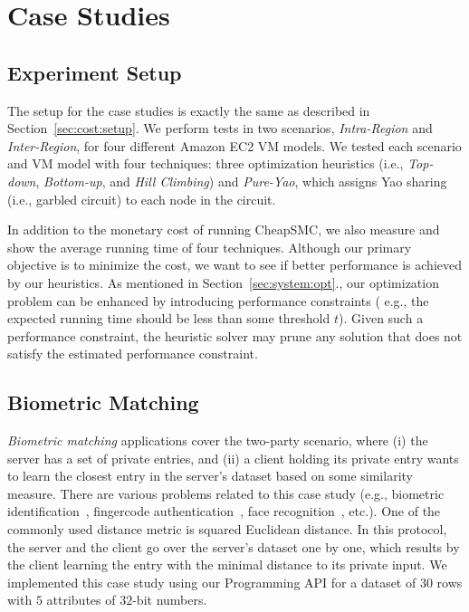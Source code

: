 \documentclass{llncs}
\newcommand{\sysname}{{CheapSMC}\xspace}
\begin{document}
\section{Case Studies}
\label{sec:case}

\subsection{Experiment Setup}
\label{sec:case:setup}

The setup for the case studies is exactly the same as described in Section~\ref{sec:cost:setup}. We perform tests in two scenarios, \emph{Intra-Region} and \emph{Inter-Region}, for four different Amazon EC2 VM models. We tested each scenario and VM model with four techniques: three optimization heuristics (i.e., \emph{Top-down}, \emph{Bottom-up}, and \emph{Hill Climbing}) and \emph{Pure-Yao}, which assigns Yao sharing (i.e., garbled circuit) to each node in the circuit. 

In addition to the monetary cost of running \sysname, we also measure and show the average running time of four techniques. Although our primary objective is to minimize the cost, we want to see if better performance is achieved by our heuristics. As mentioned in Section~\ref{sec:system:opt}., our optimization problem can be enhanced by introducing performance constraints ( e.g., the expected running time should be less than some threshold $t$). Given such a performance constraint, the heuristic solver may prune any solution that does not satisfy the estimated performance constraint. 

\subsection{Biometric Matching}
\label{sec:case:set}

\emph{Biometric matching} applications cover the two-party scenario, where (i) the server has a set of private entries, and (ii) a client holding its private entry wants to learn the closest entry in the server's dataset based on some similarity measure. There are various problems related to this case study (e.g., biometric identification~\cite{cite:evans2011efficient}, fingercode authentication~\cite{cite:barni2010privacy}, face recognition~\cite{cite:erkin2009privacy, cite:sadeghi2010efficient}, etc.). One of the commonly used distance metric is squared Euclidean distance. In this protocol, the server and the client go over the server's dataset one by one, which results by the client learning the entry with the minimal distance to its private input. We implemented this case study using our Programming API for a dataset of $30$ rows with $5$ attributes of $32$-bit numbers. 
\end{document}
